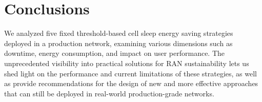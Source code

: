 \documentclass[10pt, conference, letterpaper]{IEEEtran}
\begin{document}
\begin{abstract}
%
\end{abstract}














\vspace{-2pt}
\section{Conclusions}
\vspace{-4pt}

We analyzed five fixed threshold-based cell sleep energy saving strategies deployed in a production network, examining various dimensions such as downtime, energy consumption, and impact on user performance. The unprecedented visibility into practical solutions for RAN sustainability lets us shed light on the performance and current limitations of these strategies, as well as provide recommendations for the design of new and more effective approaches that can still be deployed in real-world production-grade networks.
\end{document}
